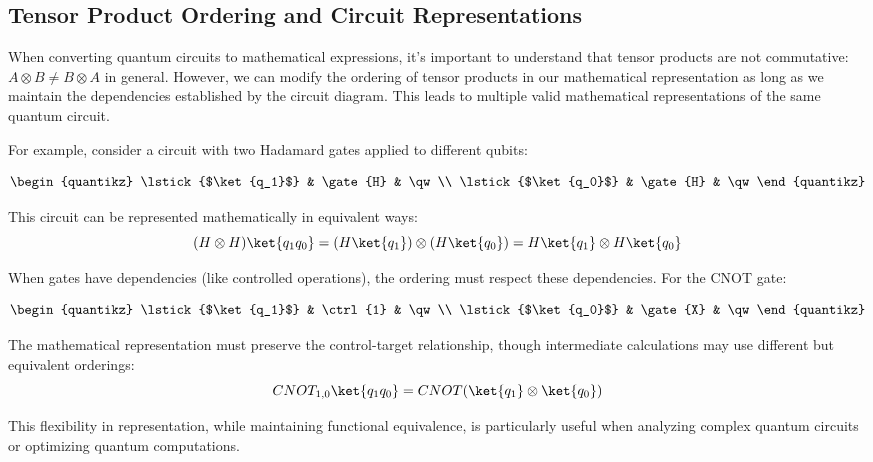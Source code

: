 \subsection*{Tensor Product Ordering and Circuit Representations}

When converting quantum circuits to mathematical expressions, it's important
to understand that tensor products are not commutative: $A \otimes B \neq B
\otimes A$ in general. However, we can modify the ordering of tensor products
in our mathematical representation as long as we maintain the dependencies
established by the circuit diagram. This leads to multiple valid mathematical
representations of the same quantum circuit.


\noindent
For example, consider a circuit with two Hadamard gates applied to different
qubits:

\begin{align*}
  \begin{quantikz}
    \lstick{$\ket{q_1}$} & \gate{H} & \qw \\
    \lstick{$\ket{q_0}$} & \gate{H} & \qw
  \end{quantikz}
\end{align*}

This circuit can be represented mathematically in equivalent ways:
\[
(H \otimes H)\ket{q_1q_0} = (H\ket{q_1}) \otimes (H\ket{q_0}) = H\ket{q_1}
\otimes H\ket{q_0}
\]

\noindent
When gates have dependencies (like controlled operations), the ordering must
respect these dependencies. For the CNOT gate:

\begin{align*}
  \begin{quantikz}
    \lstick{$\ket{q_1}$} & \ctrl{1} & \qw \\
    \lstick{$\ket{q_0}$} & \gate{X} & \qw
  \end{quantikz}
\end{align*}

\noindent
The mathematical representation must preserve the control-target
relationship, though intermediate calculations may use different but
equivalent orderings:
\[
CNOT_{1,0}\ket{q_1q_0} = CNOT(\ket{q_1} \otimes \ket{q_0})
\]

This flexibility in representation, while maintaining functional equivalence,
is particularly useful when analyzing complex quantum circuits or optimizing
quantum computations.
